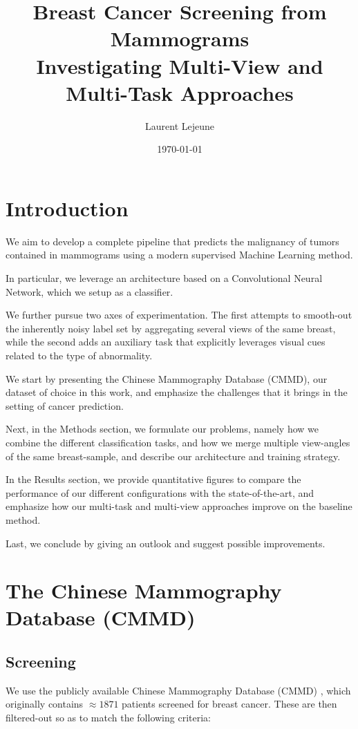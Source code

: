 \documentclass[11pt]{article}
\author{Laurent Lejeune}
\date{\today}
\title{Breast Cancer Screening from Mammograms\\\medskip
\large Investigating Multi-View and Multi-Task Approaches}
\begin{document}
\maketitle
\tableofcontents

\section{Introduction}
\label{sec:org3c61b73}

We aim to develop a complete pipeline that predicts the malignancy of tumors contained
in mammograms using a modern supervised Machine Learning method.

In particular, we leverage an architecture based on a Convolutional Neural Network,
which we setup as a classifier.

We further pursue two axes of experimentation. The first attempts to smooth-out the inherently
noisy label set by aggregating several views of the same breast, while the second
adds an auxiliary task that explicitly leverages visual cues related to the type of abnormality.

We start by presenting the Chinese Mammography Database (CMMD), our dataset of
choice in this work, and emphasize the challenges that it brings in the setting of cancer prediction.

Next, in the Methods section, we formulate our problems,
namely how we combine the different classification tasks, and how
we merge multiple view-angles of the same breast-sample,
and describe our architecture and training strategy.

In the Results section, we provide quantitative figures to compare the performance of our
different configurations with the state-of-the-art, and emphasize how our
multi-task and multi-view approaches improve on the baseline method.

Last, we conclude by giving an outlook and suggest possible improvements.
\section{The Chinese Mammography Database (CMMD)}
\label{sec:org19e3e7b}

\subsection{\label{screening}Screening}
\label{sec:org24c282c}

We use the publicly available Chinese Mammography Database (CMMD) \autocite{cai23},
which originally contains \(\approx 1871\) patients screened for breast cancer.
These are then filtered-out so as to match the following criteria:
\end{document}

